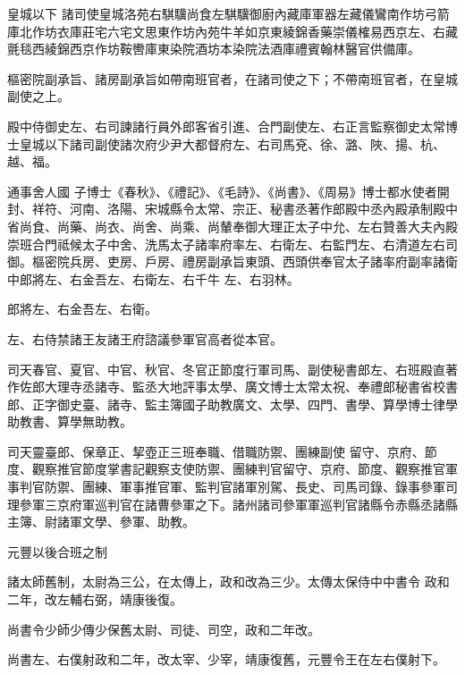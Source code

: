 \begin{pinyinscope}
 皇城以下
 諸司使皇城洛苑右騏驥尚食左騏驥御廚內藏庫軍器左藏儀鸞南作坊弓箭庫北作坊衣庫莊宅六宅文思東作坊內苑牛羊如京東綾錦香藥崇儀榷易西京左、右藏氈毯西綾錦西京作坊鞍轡庫東染院酒坊本染院法酒庫禮賓翰林醫官供備庫。



 樞密院副承旨、諸房副承旨如帶南班官者，在諸司使之下；不帶南班官者，在皇城副使之上。



 殿中侍御史左、右司諫諸行員外郎客省引進、合門副使左、右正言監察御史太常博士皇城以下諸司副使諸次府少尹大都督府左、右司馬兗、徐、潞、陜、揚、杭、越、福。



 通事舍人國
 子博士《春秋》、《禮記》、《毛詩》、《尚書》、《周易》博士都水使者開封、祥符、河南、洛陽、宋城縣令太常、宗正、秘書丞著作郎殿中丞內殿承制殿中省尚食、尚藥、尚衣、尚舍、尚乘、尚輦奉御大理正太子中允、左右贊善大夫內殿崇班合門祗候太子中舍、洗馬太子諸率府率左、右衛左、右監門左、右清道左右司御。樞密院兵房、吏房、戶房、禮房副承旨東頭、西頭供奉官太子諸率府副率諸衛中郎將左、右金吾左、右衛左、右千牛
 左、右羽林。



 郎將左、右金吾左、右衛。



 左、右侍禁諸王友諸王府諮議參軍官高者從本官。



 司天春官、夏官、中官、秋官、冬官正節度行軍司馬、副使秘書郎左、右班殿直著作佐郎大理寺丞諸寺、監丞大地評事太學、廣文博士太常太祝、奉禮郎秘書省校書郎、正字御史臺、諸寺、監主簿國子助教廣文、太學、四門、書學、算學博士律學助教書、算學無助教。



 司天靈臺郎、保章正、挈壺正三班奉職、借職防禦、團練副使
 留守、京府、節度、觀察推官節度掌書記觀察支使防禦、團練判官留守、京府、節度、觀察推官軍事判官防禦、團練、軍事推官軍、監判官諸軍別駕、長史、司馬司錄、錄事參軍司理參軍三京府軍巡判官在諸曹參軍之下。諸州諸司參軍軍巡判官諸縣令赤縣丞諸縣主簿、尉諸軍文學、參軍、助教。



 元豐以後合班之制



 諸太師舊制，太尉為三公，在太傳上，政和改為三少。太傳太保侍中中書令
 政和二年，改左輔右弼，靖康後復。



 尚書令少師少傳少保舊太尉、司徒、司空，政和二年改。



 尚書左、右僕射政和二年，改太宰、少宰，靖康復舊，元豐令王在左右僕射下。




\end{pinyinscope}
